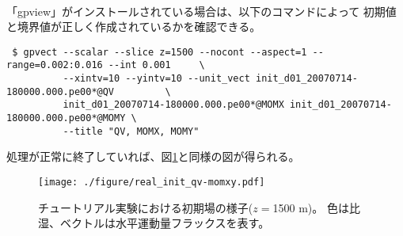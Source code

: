\vspace{1cm}
 \hrulefill \\
「gpview」がインストールされている場合は、以下のコマンドによって
初期値と境界値が正しく作成されているかを確認できる。

\begin{verbatim}
 $ gpvect --scalar --slice z=1500 --nocont --aspect=1 --range=0.002:0.016 --int 0.001     \
          --xintv=10 --yintv=10 --unit_vect init_d01_20070714-180000.000.pe00*@QV         \
          init_d01_20070714-180000.000.pe00*@MOMX init_d01_20070714-180000.000.pe00*@MOMY \
          --title "QV, MOMX, MOMY"
\end{verbatim}
処理が正常に終了していれば、図\ref{fig:init}と同様の図が得られる。

\begin{figure}[h]
\begin{center}
  \texttt{[image: ./figure/real\_init\_qv-momxy.pdf]}\\
  \caption{チュートリアル実験における初期場の様子($z=$1500 m)。
           色は比湿、ベクトルは水平運動量フラックスを表す。}
  \label{fig:init}
\end{center}
\end{figure}
